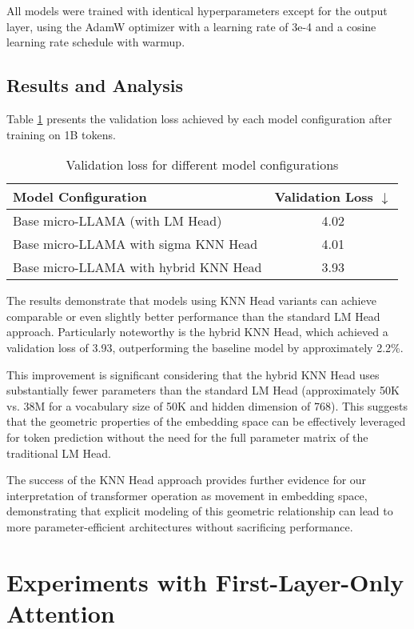 All models were trained with identical hyperparameters except for the output layer, using the AdamW optimizer with a learning rate of 3e-4 and a cosine learning rate schedule with warmup.

\subsection{Results and Analysis}

Table \ref{tab:knn_head_results} presents the validation loss achieved by each model configuration after training on 1B tokens.

\begin{table}[h]
    \centering
    \caption{Validation loss for different model configurations}
    \begin{tabular}{lc}
    \toprule
    Model Configuration & Validation Loss $\downarrow$ \\
    \midrule
    Base micro-LLAMA (with LM Head) & 4.02 \\
    Base micro-LLAMA with sigma KNN Head & 4.01 \\
    Base micro-LLAMA with hybrid KNN Head & 3.93 \\
    \bottomrule
    \end{tabular}
    \label{tab:knn_head_results}
\end{table}

The results demonstrate that models using KNN Head variants can achieve comparable or even slightly better performance than the standard LM Head approach. Particularly noteworthy is the hybrid KNN Head, which achieved a validation loss of 3.93, outperforming the baseline model by approximately 2.2\%.

This improvement is significant considering that the hybrid KNN Head uses substantially fewer parameters than the standard LM Head (approximately 50K vs. 38M for a vocabulary size of 50K and hidden dimension of 768). This suggests that the geometric properties of the embedding space can be effectively leveraged for token prediction without the need for the full parameter matrix of the traditional LM Head.

The success of the KNN Head approach provides further evidence for our interpretation of transformer operation as movement in embedding space, demonstrating that explicit modeling of this geometric relationship can lead to more parameter-efficient architectures without sacrificing performance.

\section{Experiments with First-Layer-Only Attention}

